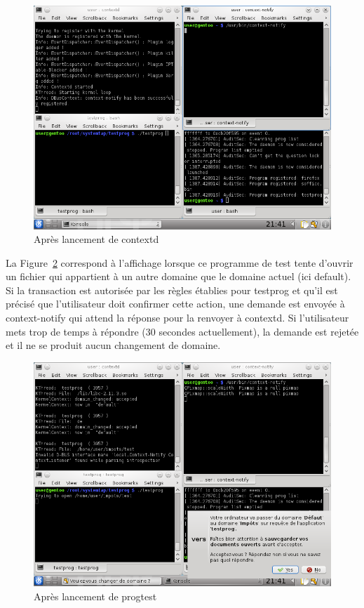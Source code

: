 \documentclass[pdftex,a4paper,titlepage,11pt]{article}
\begin{document}
\begin{figure}%
	\centering
	\includegraphics[scale=0.5]{attachements/capture_ini.png}
	\caption{Après lancement de contextd}
	\label{INI}
\end{figure}

La Figure~\ref{DEMANDE} correspond à l'affichage lorsque ce programme de test tente d'ouvrir un fichier qui appartient à un autre domaine que le domaine actuel (ici default). Si la transaction est autorisée par les règles établies pour testprog et qu'il est précisé que l'utilisateur doit confirmer cette action, une demande est envoyée à context-notify qui attend la réponse pour la renvoyer à contextd. Si l'utilisateur mets trop de temps à répondre (30 secondes actuellement), la demande est rejetée et il ne se produit aucun changement de domaine.

\begin{figure}%
	\centering
	\includegraphics[scale=0.5]{attachements/capture_notify.png}
	\caption{Après lancement de progtest}
	\label{DEMANDE}
\end{figure}
\end{document}

